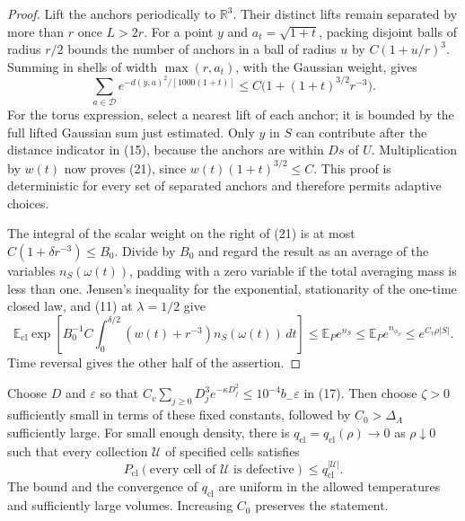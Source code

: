 \begin{proof}
Lift the anchors periodically to $\mathbb R^3$. Their distinct
lifts remain separated by more than $r$ once $L>2r$.
For a point $y$ and $a_t=\sqrt{1+t}$, packing disjoint balls
of radius $r/2$ bounds the number of anchors in a ball of radius
$u$ by $C(1+u/r)^3$. Summing in shells of width
$\max(r,a_t)$, with the Gaussian weight, gives
\[
 \sum_{a\in\mathcal D}
 e^{-d(y,a)^2/[1000(1+t)]}
 \leq C\bigl(1+(1+t)^{3/2}r^{-3}\bigr).
\]
For the torus expression, select a nearest lift of each anchor;
it is bounded by the full lifted Gaussian sum just estimated.
Only $y$ in $S$ can contribute after the distance indicator
in (15), because the anchors are within $Ds$ of $U$.
Multiplication by $w(t)$ now proves (21), since
$w(t)(1+t)^{3/2}\leq C$. This proof is deterministic for every
set of separated anchors and therefore permits adaptive choices.

The integral of the scalar weight on the right of (21) is at
most $C(1+\delta r^{-3})\leq B_0$.
Divide by $B_0$ and regard the result as an average of the
variables $n_S(\omega(t))$, padding with a zero variable if
the total averaging mass is less than one. Jensen's inequality
for the exponential, stationarity of the one-time closed law,
and (11) at $\lambda=1/2$ give
\[
 \mathbb E_{\mathrm{cl}}\exp\left[
 B_0^{-1}C\int_0^{\delta/2}(w(t)+r^{-3})n_S(\omega(t))\,dt
 \right]
 \leq\mathbb E_Pe^{n_S}
 \leq\mathbb E_Pe^{n_{\phi_S}}
 \leq e^{C_v\rho|S|}.
\]
Time reversal gives the other half of the assertion.
\end{proof}

\begin{proposition}\label{prop:defective-cells}
Choose $D$ and $\varepsilon$ so that
$C_v\sum_{j\geq0}D_j^3e^{-\kappa D_j^2}
\leq10^{-4}b_-\varepsilon$ in (17). Then choose $\zeta>0$
sufficiently small in terms of these fixed constants, followed
by $C_0>\Delta_A$ sufficiently large. For small enough density,
there is $q_{\mathrm{cl}}=q_{\mathrm{cl}}(\rho)\to0$ as
$\rho\downarrow0$ such that every collection $\mathcal U$
of specified cells satisfies
\begin{equation}
 P_{\mathrm{cl}}(\text{every cell of }\mathcal U
                         \text{ is defective})
 \leq q_{\mathrm{cl}}^{|\mathcal U|}.
 \tag{22}\label{eq:22}
\end{equation}
The bound and the convergence of $q_{\mathrm{cl}}$ are uniform
in the allowed temperatures and sufficiently large volumes.
Increasing $C_0$ preserves the statement.
\end{proposition}


